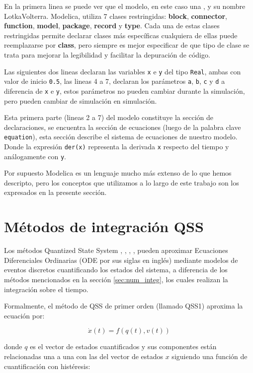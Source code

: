 	En la primera linea se puede ver que el modelo, en este caso una , y su nombre LotkaVolterra.
	Modelica, utiliza 7 clases restringidas:
	\textbf{block}, \textbf{connector}, \textbf{function}, \textbf{model}, \textbf{package}, \textbf{record} y \textbf{type}.
	Cada una de estas clases restringidas permite declarar clases más específicas cualquiera de ellas puede reemplazarse
	por \textbf{class}, pero siempre es mejor especificar de que tipo de clase se trata para mejorar la legibilidad y facilitar la depuración de código.

	Las siguientes dos lineas declaran las variables \texttt{x} e \texttt{y} del tipo \texttt{Real}, ambas con valor de inicio \texttt{0.5}, las lineas 4 a 7, 
	declaran los parámetros \texttt{a}, \texttt{b}, \texttt{c} y \texttt{d} a diferencia de \texttt{x} e \texttt{y}, estos parámetros no pueden cambiar durante la 
	simulación, pero pueden cambiar de simulación en simulación.

	Esta primera parte (lineas 2 a 7) del modelo constituye la sección de declaraciones, se encuentra la sección de ecuaciones (luego de la palabra clave 
	\texttt{equation}), esta sección describe el sistema de ecuaciones de nuestro modelo. Donde la expresión \texttt{der(x)} representa la derivada \texttt{x} 
	respecto del tiempo y análogamente con \texttt{y}.
	
	Por supuesto Modelica es un lenguaje mucho más extenso de lo que hemos descripto, pero los conceptos que utilizamos a lo largo de este trabajo son los
	expresados en la presente sección.


\section{Métodos de integración QSS}
	Los métodos Quantized State System \cite{Fer12}, \cite{Ber12}, \cite{Beltrame06quantisedstate}, \cite{Cel06}, pueden aproximar Ecuaciones 
	Diferenciales Ordinarias (ODE por sus siglas en inglés) mediante modelos de eventos discretos cuantificando los estados del sistema, 
	a diferencia de los métodos mencionados en la sección \ref{sec:num_integ}, los cuales realizan la integración sobre el tiempo. 

	Formalmente, el método de QSS de primer orden (llamado QSS1) aproxima la ecuación por:
	
	\begin{equation}
	\dot{x}(t) = f (q(t), v(t))
	\end{equation}
	
	donde $q$ es el vector de estados cuantificados y sus componentes están relacionadas una a una con las del vector de estados $x$ siguiendo una 
	función de cuantificación con histéresis:
	

